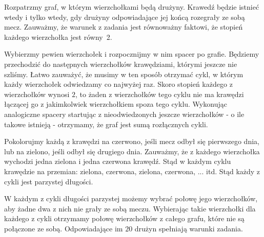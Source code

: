 \noindent
Rozpatrzmy graf, w którym wierzchołkami będą drużyny. Krawedź będzie istnieć wtedy i tylko wtedy, gdy drużyny odpowiadające jej końcą rozegrały ze sobą mecz. Zauważmy, że warunek z zadania jest równoważny faktowi, że stopień każdego wierzchołka jest równy~2. 

Wybierzmy pewien wierzchołek i rozpocznijmy w nim spacer po grafie. Będziemy przechodzić do następnych wierzchołków krawędziami, którymi jeszcze nie szliśmy. Łatwo zauważyć, że musimy w ten sposób otrzymać cykl, w którym każdy wierzchołek odwiedzamy co najwyżej raz. Skoro stopień każdego z wierzchołków wynosi $2$, to żaden z wierzchołków tego cyklu nie ma krawędzi łączącej go z jakimkolwiek wierzchołkiem spoza tego cyklu. Wykonując analogiczne spacery startując z nieodwiedzonych jeszcze wierzchołków - o ile takowe istnieją - otrzymamy, że graf jest sumą rozłącznych cykli.

Pokolorujmy każdą z krawędzi na czerwono, jeśli mecz odbył się pierwszego dnia, lub na zielono, jeśli odbył się drugiego dnia. Zauważmy, że z każdego wierzchołka wychodzi jedna zielona i jedna czerwona krawędź. Stąd w każdym cyklu krawędzie na przemian: zielona, czerwona, zielona, czerwona, ... itd. Stąd każdy z cykli jest parzystej długości. 

\begin{center}
\end{center}

W każdym z cykli długości parzystej możemy wybrać połowę jego wierzchołków, aby żadne dwa z nich nie grały ze sobą meczu. Wybierając takie wierzchołki dla każdego z cykli otrzymamy połowę wierzchołków z całego grafu, które nie są połączone ze sobą. Odpowiadające im $20$ drużyn spełniają warunki zadania.

\vspace{5px}

